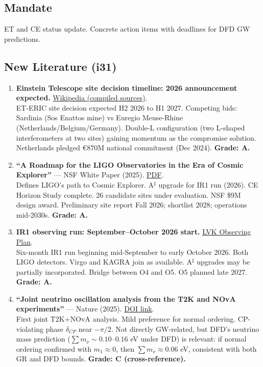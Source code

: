 \documentclass[11pt,a4paper]{article}
\begin{document}
\subsection{Mandate}
ET and CE status update. Concrete action items with deadlines for DFD GW predictions.

\subsection{New Literature (i31)}

\begin{enumerate}
\item \textbf{Einstein Telescope site decision timeline: 2026 announcement expected.} \href{https://en.wikipedia.org/wiki/Einstein_Telescope}{Wikipedia (compiled sources)}.\\
ET-ERIC site decision expected H2 2026 to H1 2027. Competing bids: Sardinia (Sos Enattos mine) vs Euregio Meuse-Rhine (Netherlands/Belgium/Germany). Double-L configuration (two L-shaped interferometers at two sites) gaining momentum as the compromise solution. Netherlands pledged \euro 870M national commitment (Dec 2024). \textbf{Grade: A.}

\item \textbf{``A Roadmap for the LIGO Observatories in the Era of Cosmic Explorer''} --- NSF White Paper (2025). \href{https://nsf-gov-resources.nsf.gov/files/ligo-observatories-white-paper-submission.pdf}{PDF}.\\
Defines LIGO's path to Cosmic Explorer. A$^\sharp$ upgrade for IR1 run (2026). CE Horizon Study complete. 26 candidate sites under evaluation. NSF \$9M design award. Preliminary site report Fall 2026; shortlist 2028; operations mid-2030s. \textbf{Grade: A.}

\item \textbf{IR1 observing run: September--October 2026 start.} \href{https://observing.docs.ligo.org/plan/}{LVK Observing Plan}.\\
Six-month IR1 run beginning mid-September to early October 2026. Both LIGO detectors. Virgo and KAGRA join as available. A$^\sharp$ upgrades may be partially incorporated. Bridge between O4 and O5. O5 planned late 2027. \textbf{Grade: A.}

\item \textbf{``Joint neutrino oscillation analysis from the T2K and NOvA experiments''} --- Nature (2025). \href{https://www.nature.com/articles/s41586-025-09599-3}{DOI link}.\\
First joint T2K+NOvA analysis. Mild preference for normal ordering. CP-violating phase $\delta_{CP}$ near $-\pi/2$. Not directly GW-related, but DFD's neutrino mass prediction ($\sum m_\nu \sim 0.10$--$0.16$ eV under DFD) is relevant: if normal ordering confirmed with $m_1 \approx 0$, then $\sum m_\nu \approx 0.06$ eV, consistent with both GR and DFD bounds. \textbf{Grade: C (cross-reference).}
\end{enumerate}
\end{document}
